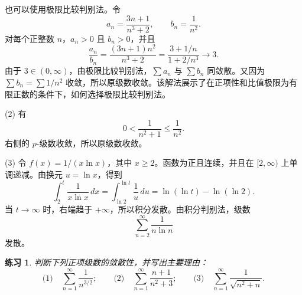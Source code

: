 \documentclass[UTF8,fontset=fandol,11pt]{ctexart}
\newtheorem{exercise}[definition]{练习}
\begin{document}
也可以使用极限比较判别法。令
\[
a_n=\frac{3n+1}{n^3+2},\qquad b_n=\frac1{n^2}.
\]
对每个正整数 $n$，$a_n>0$ 且 $b_n>0$，并且
\[
\frac{a_n}{b_n}=\frac{(3n+1)n^2}{n^3+2}
=\frac{3+1/n}{1+2/n^3}\longrightarrow3.
\]
由于 $3\in(0,\infty)$，由极限比较判别法，$\sum a_n$ 与 $\sum b_n$ 同敛散。又因为 $\sum b_n=\sum 1/n^2$ 收敛，所以原级数收敛。该解法展示了在正项性和比值极限为有限正数的条件下，如何选择极限比较判别法。

(2) 有
\[
0<\frac{1}{n^2+1}\leq\frac{1}{n^2}.
\]
右侧的 $p$-级数收敛，所以原级数收敛。

(3) 令 $f(x)=1/(x\ln x)$，其中 $x\geq2$。函数为正且连续，并且在 $[2,\infty)$ 上单调递减。由换元 $u=\ln x$，得到
\[
\int_2^t\frac{1}{x\ln x}\,dx
=\int_{\ln2}^{\ln t}\frac{1}{u}\,du
=\ln(\ln t)-\ln(\ln2).
\]
当 $t\to\infty$ 时，右端趋于 $+\infty$，所以积分发散。由积分判别法，级数
\[
\sum_{n=2}^{\infty}\frac{1}{n\ln n}
\]
发散。\par
\begin{exercise}
\label{mathagent:exercise:0f13776c11d825df9fdf2c3c249691355909a96d5e874285ceb15e0c4116d477}
判断下列正项级数的敛散性，并写出主要理由：
\[
\text{(1)}\quad\sum_{n=1}^{\infty}\frac{1}{n^{3/2}};
\qquad
\text{(2)}\quad\sum_{n=1}^{\infty}\frac{n+1}{n^2+3};
\qquad
\text{(3)}\quad\sum_{n=1}^{\infty}\frac{1}{\sqrt{n^2+n}}.
\]

\end{exercise}
\end{document}
